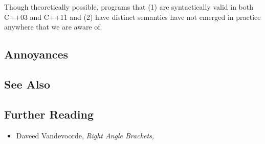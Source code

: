 \noindent Though theoretically possible, programs that (1) are syntactically valid
in both C++03 and C++11 and (2) have distinct semantics have not
emerged in practice anywhere that we are aware of.

\subsection[Annoyances]{Annoyances}\label{annoyances}

\hspace{\fill}

\subsection[See Also]{See Also}\label{see-also}

\hspace{\fill}

\subsection[Further Reading]{Further Reading}\label{further-reading}

\begin{itemize}
\item{Daveed Vandevoorde, \textit{Right Angle Brackets,} \cite{vandevoorde05}}
\end{itemize}


